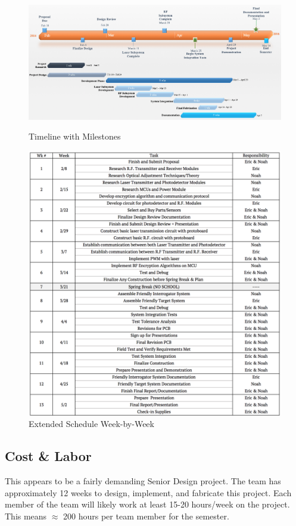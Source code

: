 \documentclass[openbib,letterpaper,10pt]{article}
\begin{document}
\begin{spacing}{1.15}
\begin{figure} [H]
	\centering
	\includegraphics[scale=0.45]{Timeline.png}
	\label{fig:timeline}
	\caption{Timeline with Milestones\label{fig:timeline}}
\end{figure}

\begin{figure} [H]
	\centering
	\includegraphics[scale=0.65]{Schedule_Extended.png}
	\caption{Extended Schedule Week-by-Week\label{fig:schedule}}
\end{figure}


\subsection{Cost \& Labor}
This appears to be a fairly demanding Senior Design project. The team has approximately 12 weeks to design, implement, and fabricate this project. Each member of the team will likely work at least 15-20 hours/week on the project. This means $\approx$ 200 hours per team member for the semester. 


\end{spacing}
\end{document}
